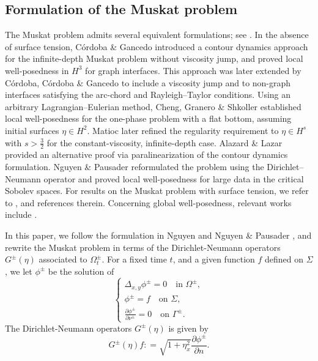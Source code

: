 \documentclass[12pt]{amsart}
\theoremstyle{definition}
\numberwithin{equation}{section}
\newcommand{\p}{\partial}
\begin{document}
\subsection{Formulation of the Muskat problem}
The Muskat problem admits several equivalent formulations; see \cite{MR4520423,MR3415681,MR3171344,MR2313156,MR2993754,MR3608884,MR3071395}. 
In the absence of surface tension, C\'ordoba \& Gancedo \cite{MR2318314} introduced a contour dynamics approach for the infinite-depth Muskat problem without viscosity jump, and proved local well-posedness in $H^3$ for graph interfaces. 
This approach was later extended by C\'ordoba, C\'ordoba \& Gancedo \cite{MR2753607,MR3071395} to include a viscosity jump and to non-graph interfaces satisfying the arc-chord and Rayleigh–Taylor conditions.
Using an arbitrary Lagrangian–Eulerian method, Cheng, Granero \& Shkoller \cite{MR3415681} established local well-posedness for the one-phase problem with a flat bottom, assuming initial surfaces $\eta \in H^2$.
Matioc \cite{MR3861893} later refined the regularity requirement to $\eta \in H^s$ with $s > \frac32$ for the constant-viscosity, infinite-depth case. 
Alazard \& Lazar \cite{MR4097324} provided an alternative proof via paralinearization of the contour dynamics formulation.
Nguyen \& Pausader \cite{MR4090462} reformulated the problem using the Dirichlet–Neumann operator and proved local well-posedness for large data in the critical Sobolev spaces. 
For results on the Muskat problem with surface tension, we refer to \cite{MR4131404,MR2162781,MR3841857}, and references therein.
Concerning global well-posedness, relevant works include \cite{MR3869383,MR3415681,MR4363243,MR3899970,MR3595492,MR2998834,Lazar,MR4348695,MR4655356}.

In this paper, we follow the formulation in Nguyen \cite{MR4131404} and Nguyen \& Pausader \cite{MR4090462}, and rewrite the Muskat problem in terms of the Dirichlet-Neumann operators $G^\pm(\eta)$ associated to $\Omega^\pm_t$. 
For a fixed time $t$, and a given function $f$ defined on $\Sigma$, we let $\phi^\pm$ be the solution of 
\begin{equation*}
\begin{cases}
 \Delta_{x,y} \phi^\pm = 0 \quad \text{in }\Omega^\pm, \\
\phi^\pm = f \quad \text{on }\Sigma, \\
\frac{\p \phi^\pm}{\p\nu^\pm} = 0 \quad \text{on }\Gamma^\pm.
\end{cases}
\end{equation*}
The Dirichlet-Neumann operators $G^\pm(\eta)$ is given by
\begin{equation*}
 G^\pm(\eta) f : = \sqrt{1+\eta_x^2} \frac{\p \phi^\pm}{\p n}.  
\end{equation*}
\end{document}

